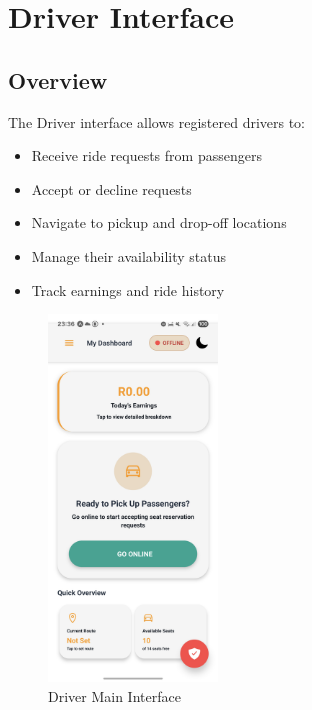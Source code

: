 \documentclass[12pt]{article}
\begin{document}
\section{Driver Interface}

\subsection{Overview}
The Driver interface allows registered drivers to:
\begin{itemize}
    \item Receive ride requests from passengers
    \item Accept or decline requests
    \item Navigate to pickup and drop-off locations
    \item Manage their availability status
    \item Track earnings and ride history
\end{itemize}

\begin{figure}[H]
  \centering
  \includegraphics[width=0.4\textwidth]{driver_interface.png}
  \caption{Driver Main Interface}
\end{figure}
\end{document}
